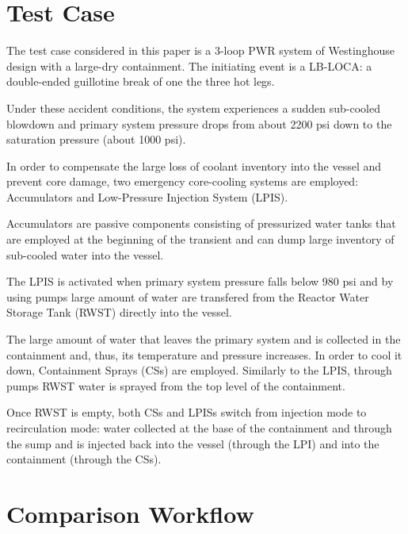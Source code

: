 \section{Test Case}
\label{sec:testCase}

The test case considered in this paper is a 3-loop PWR system of Westinghouse 
design with a large-dry containment.
The initiating event is a LB-LOCA: a double-ended guillotine break of one the three hot legs.

Under these accident conditions, the system experiences a sudden sub-cooled blowdown and 
primary system pressure drops from about 2200 psi down to the saturation pressure 
(about 1000 psi).

In order to compensate the large loss of coolant inventory into the vessel and prevent
core damage, two emergency core-cooling systems are employed: Accumulators and 
Low-Pressure Injection System (LPIS).

Accumulators are passive components consisting of pressurized water tanks that are 
employed at the beginning of the transient and can dump large inventory of sub-cooled water
into the vessel.

The LPIS is activated when primary system pressure falls below 980 psi and by using pumps
large amount of water are transfered from the Reactor Water Storage Tank (RWST) directly 
into the vessel.

The large amount of water that leaves the primary system and is collected in the containment
and, thus, its temperature and pressure increases. In order to cool it down, Containment
Sprays (CSs) are employed. Similarly to the LPIS, through pumps RWST water is sprayed from the 
top level of the containment. 

Once RWST is empty, both CSs and LPISs switch from injection mode to recirculation mode: 
water collected at the base of the containment and through the sump and is injected back 
into the vessel (through the LPI) and into the containment (through the CSs).


\section{Comparison Workflow}


